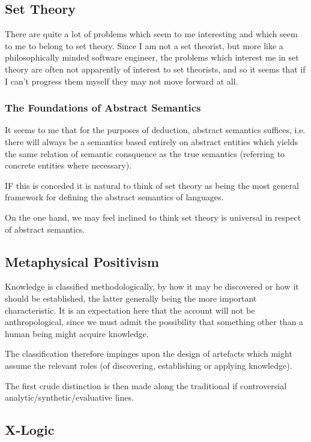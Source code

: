 \documentclass[numreferences]{rbjk}
\begin{document}
\begin{article}
\subsection{Set Theory}

There are quite a lot of problems which seem to me interesting and which seem to me to belong to set theory.
Since I am not a set theorist, but more like a philosophically minded software engineer, the problems which interest me in set theory are often not apparently of interest to set theorists, and so it seems that if I can't progress them myself they may not move forward at all.

\subsubsection{The Foundations of Abstract Semantics}

It seems to me that for the purposes of deduction, abstract semantics suffices, i.e. there will always be a semantics based entirely on abstract entities which yields the same relation of semantic consquence as the true semantics (referring to concrete entities where necessary).

IF this is conceded it is natural to think of set theory as being the most general framework for defining the abstract semantics of languages.

On the one hand, we may feel inclined to think set theory is universal in respect of abstract semantics.


\subsection{Metaphysical Positivism}

Knowledge is classified methodologically, by how it may be discovered or how it should be established, the latter generally being the more important characteristic.
It is an expectation here that the account will not be anthropological, since we must admit the possibility that something other than a human being might acquire knowledge.

The classification therefore impinges upon the design of artefacts which might assume the relevant roles (of discovering, establishing or applying knowledge).

The first crude distinction is then made along the traditional if controversial analytic/synthetic/evaluative lines.

\subsection{X-Logic}


\end{article}
\end{document}
